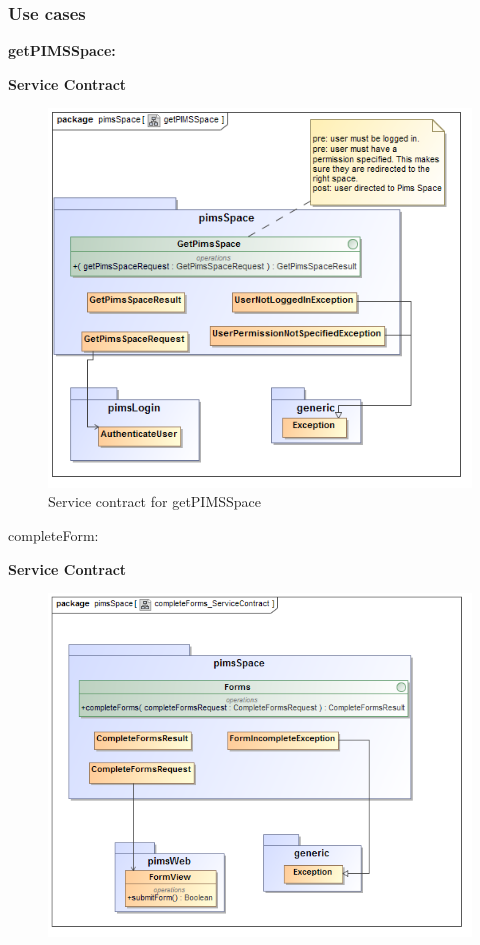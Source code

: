 \subsubsection{Use cases}
\begin{description}
	\item{\textbf{getPIMSSpace:}}
		\begin{description}
		\item{\textbf{Service Contract}}
		\begin{figure}[H]
			\centerline{\includegraphics[width=0.7\linewidth]{./Functional_Requirements/Graphics/pimsSpace/getPIMSSpace}}
			\caption{Service contract for getPIMSSpace}
		\end{figure}
	\end{description} 
	\item{completeForm:}
			\begin{description}
		\item{\textbf{Service Contract}}
		\begin{figure}[H]
			\centerline{\includegraphics[width=0.7\linewidth]{./Functional_Requirements/Graphics/pimsSpace/completeForms_ServiceContract}}

\end{figure}
\end{description}
\end{description}
